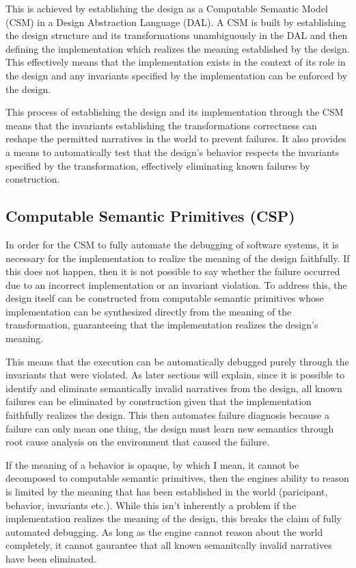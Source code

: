 \documentclass{article}
\begin{document}
This is achieved by establishing the design as a Computable Semantic Model (CSM) in a Design Abstraction Language (DAL). A CSM is built by establishing the design structure and its transformations unambiguously in the DAL and then defining the implementation which realizes the meaning established by the design. This effectively means that the implementation exists in the context of its role in the design and any invariants specified by the implementation can be enforced by the design.

This process of establishing the design and its implementation through the CSM means that the invariants establishing the transformations correctness can reshape the permitted narratives in the world to prevent failures. It also provides a means to automatically test that the design's behavior respects the invariants specified by the transformation, effectively eliminating known failures by construction.

\subsection{Computable Semantic Primitives (CSP)}

In order for the CSM to fully automate the debugging of software systems, it is necessary for the implementation to realize the meaning of the design faithfully. If this does not happen, then it is not possible to say whether the failure occurred due to an incorrect implementation or an invariant violation. To address this, the design itself can be constructed from computable semantic primitives whose implementation can be synthesized directly from the meaning of the transformation, guaranteeing that the implementation realizes the design's meaning.

This means that the execution can be automatically debugged purely through the invariants that were violated. As later sections will explain, since it is possible to identify and eliminate semantically invalid narratives from the design, all known failures can be eliminated by construction given that the implementation faithfully realizes the design. This then automates failure diagnosis because a failure can only mean one thing, the design must learn new semantics through root cause analysis on the environment that caused the failure.

If the meaning of a behavior is opaque, by which I mean, it cannot be decomposed to computable semantic primitives, then the engines ability to reason is limited by the meaning that has been established in the world (paricipant, behavior, invariants etc.). While this isn't inherently a problem if the implementation realizes the meaning of the design, this breaks the claim of fully automated debugging. As long as the engine cannot reason about the world completely, it cannot gaurantee that all known semanitcally invalid narratives have been eliminated.
\end{document}
